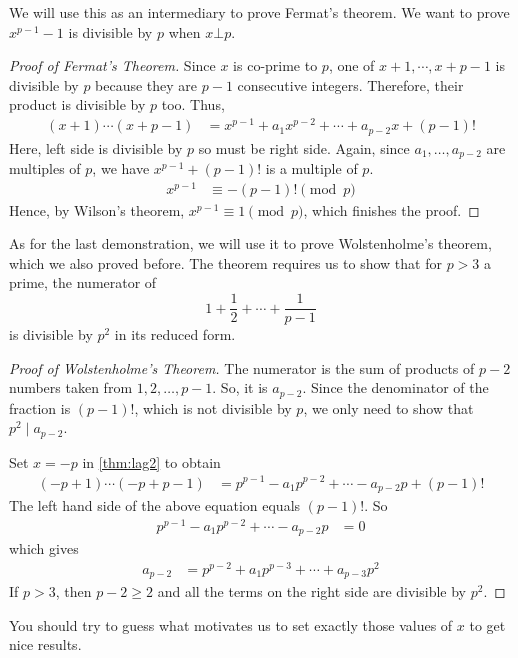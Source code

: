 We will use this as an intermediary to prove Fermat's theorem. We want to prove $x^{p-1}-1$ is divisible by $p$ when $x\bot p$.
	\begin{proof}[Proof of Fermat's Theorem]
		Since $x$ is co-prime to $p$, one of $x+1,\cdots,x+p-1$ is divisible by $p$ because they are $p-1$ consecutive integers. Therefore, their product is divisible by $p$ too. Thus,
			\begin{align*}
				(x+1)\cdots(x+p-1) & = x^{p-1}+a_1x^{p-2}+\cdots+a_{p-2}x+(p-1)!
			\end{align*}
		Here, left side is divisible by $p$ so must be right side. Again, since $a_1,\ldots,a_{p-2}$ are multiples of $p$, we have $x^{p-1}+(p-1)!$ is a multiple of $p$.
			\begin{align*}
				x^{p-1} & \equiv-(p-1)!\pmod p
			\end{align*}
		Hence, by Wilson's theorem, $x^{p-1} \equiv 1 \pmod p$, which finishes the proof.
	\end{proof}
As for the last demonstration, we will use it to prove Wolstenholme's theorem, which we also proved before. The theorem requires us to show that for $p>3$ a prime, the numerator of $$1+\dfrac{1}{2}+\cdots+\dfrac{1}{p-1}$$ is divisible by $p^2$ in its reduced form.
	\begin{proof}[Proof of Wolstenholme's Theorem]
		The numerator is the sum of products of $p-2$ numbers taken from $1, 2, \ldots, p-1$. So, it is $a_{p-2}$. Since the denominator of the fraction is $(p-1)!$, which is not divisible by $p$, we only need to show that $p^2\mid a_{p-2}$.

		Set $x=-p$ in \autoref{thm:lag2} to obtain
			\begin{align*}
				(-p+1)\cdots(-p+p-1)
					& = p^{p-1}-a_1p^{p-2}+\cdots-a_{p-2}p+(p-1)!
			\end{align*}
		The left hand side of the above equation equals $(p-1)!$. So
			\begin{align*}
				p^{p-1}-a_1p^{p-2}+\cdots-a_{p-2}p
					& = 0
			\end{align*}
		which gives
			\begin{align*}
				a_{p-2}
					& = p^{p-2}+a_1p^{p-3}+\cdots+a_{p-3}p^2
			\end{align*}
		If $p>3$, then $p-2\geq 2$ and all the terms on the right side are divisible by $p^2$.
	\end{proof}

	\begin{note}
		You should try to guess what motivates us to set exactly those values of $x$ to get nice results.
	\end{note}
